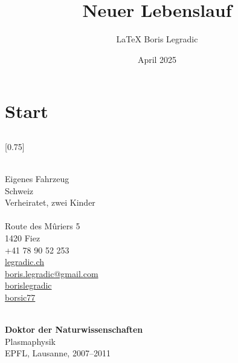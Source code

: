 \documentclass[verylight]{simplehipstercv}
\title{Neuer Lebenslauf}
\author{\LaTeX{} Boris Legradic}
\date{April 2025}
\begin{document}
\thispagestyle{empty}

\section*{Start}


\subsection*{}
\vspace{4em}

\setlength{\columnsep}{1.5cm}
[0.75]
\begin{paracol}{2}
\paracolbackgroundoptions

\footnotesize
{\setasidefontcolour
\flushright

\bigskip \bigskip
\begin{center}
\end{center}
\bigskip \bigskip

\\[0.5em]
Eigenes Fahrzeug\\
Schweiz\\
Verheiratet, zwei Kinder\\

\bigskip \bigskip
{}\\[0.5em]
Route des Mûriers 5\\
1420 Fiez\\
+41 78 90 52 253\\

\bigskip
\href{https://legradic.ch}{legradic.ch }\\
\href{mailto:boris.legradic@gmail.com}{boris.legradic@gmail.com }\\
\href{https://www.linkedin.com/in/borislegradic}{borislegradic }\\
\href{https://github.com/borsic77}{borsic77 }

\bigskip \bigskip
{}\\[0.5em]

\textbf{Doktor der Naturwissenschaften}\\
Plasmaphysik\\
EPFL, Lausanne, 2007–2011\\[0.5em]

}
\end{paracol}
\end{document}
